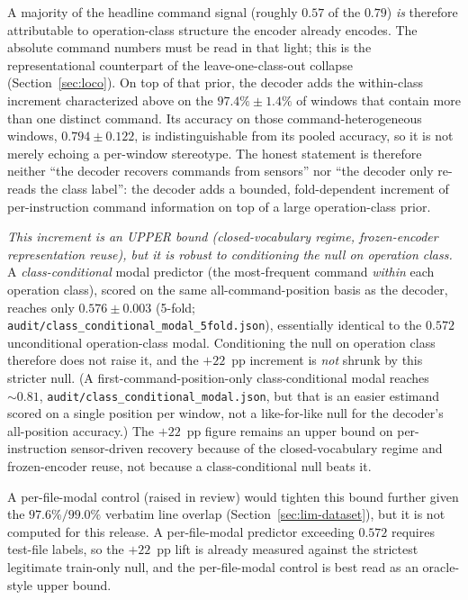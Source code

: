 \documentclass[sensors,article,submit,moreauthors,pdftex]{Definitions/mdpi}
\begin{document}
A majority of the headline command signal (roughly $0.57$ of the $0.79$) \emph{is} therefore attributable to operation-class structure the encoder already encodes. The absolute command numbers must be read in that light; this is the representational counterpart of the leave-one-class-out collapse (Section~\ref{sec:loco}). On top of that prior, the decoder adds the within-class increment characterized above on the $97.4\% \pm 1.4\%$ of windows that contain more than one distinct command. Its accuracy on those command-heterogeneous windows, $0.794 \pm 0.122$, is indistinguishable from its pooled accuracy, so it is not merely echoing a per-window stereotype. The honest statement is therefore neither ``the decoder recovers commands from sensors'' nor ``the decoder only re-reads the class label'': the decoder adds a bounded, fold-dependent increment of per-instruction command information on top of a large operation-class prior.

\emph{This increment is an UPPER bound (closed-vocabulary regime, frozen-encoder representation reuse), but it is robust to conditioning the null on operation class.} A \emph{class-conditional} modal predictor (the most-frequent command \emph{within} each operation class), scored on the same all-command-position basis as the decoder, reaches only $0.576 \pm 0.003$ (5-fold; \texttt{audit/class\_conditional\_modal\_5fold.json}), essentially identical to the $0.572$ unconditional operation-class modal. Conditioning the null on operation class therefore does not raise it, and the $+22$~pp increment is \emph{not} shrunk by this stricter null. (A first-command-position-only class-conditional modal reaches $\sim\!0.81$, \texttt{audit/class\_conditional\_modal.json}, but that is an easier estimand scored on a single position per window, not a like-for-like null for the decoder's all-position accuracy.) The $+22$~pp figure remains an upper bound on per-instruction sensor-driven recovery because of the closed-vocabulary regime and frozen-encoder reuse, not because a class-conditional null beats it.

A per-file-modal control (raised in review) would tighten this bound further given the $97.6\%/99.0\%$ verbatim line overlap (Section~\ref{sec:lim-dataset}), but it is not computed for this release. A per-file-modal predictor exceeding $0.572$ requires test-file labels, so the $+22$~pp lift is already measured against the strictest legitimate train-only null, and the per-file-modal control is best read as an oracle-style upper bound.
\end{document}
